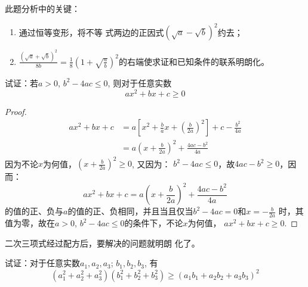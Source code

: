 \begin{rmk}
    此题分析中的关键：
    \begin{enumerate}
        \item 通过恒等变形，将不等
    式两边的正因式$\left(\sqrt{a}-\sqrt{b}\right)^2$约去；
    \item $\frac{\left(\sqrt{a}+\sqrt{b}\right)^2}{8b}=\frac{1}{8}\left(1+\sqrt{\frac{a}{b}}\right)^2$的右端使求证和已知条件的联系明朗化。
    \end{enumerate}
\end{rmk}



\begin{example}
    试证：若$a>0$, $b^2-4ac\le 0$, 则对于任意实数
\begin{equation}
    ax^2+bx+c\ge 0
\end{equation}
\end{example}

\begin{proof}
\[\begin{split}
    ax^2+bx+c&=a\left[x^2+\frac{b}{a}x+\left(\frac{b}{2a}\right)^2\right]+c-\frac{b^2}{4a}\\
    &=a\left(x+\frac{b}{2a}\right)^2+\frac{4ac-b^2}{4a}
\end{split}\]
因为不论$x$为何值，$\left(x+\frac{b}{2a}\right)^2\ge 0$, 又因为：
$b^2-4ac\le 0$，故$4ac-b^2\ge 0$，因而：
\[ax^2+bx+c=a\left(x+\frac{b}{2a}\right)^2+\frac{4ac-b^2}{4a}\]
的值的正、负与$a$的值的正、负相同，并且当且仅当$b^2-4ac=0$和$x=-\frac{b}{2a}$
时，其值为零，故在$a>0$, $b^2-4ac\le 0$的条件下，不论$x$为何值，
$ax^2+bx+c\ge 0$.
\end{proof}

\begin{rmk}
    二次三项式经过配方后，要解决的问题就明朗
    化了。    
\end{rmk}


\begin{example}
    试证：对于任意实数$a_1,a_2,a_3$; $b_1,b_2,b_3$, 有
  \begin{equation}
      (a_1^2+a_2^2+a_3^2)(b_1^2+b_2^2+b_3^2)\ge (a_1b_1+a_2b_2+a_3b_3)^2
  \end{equation} 
\end{example}

